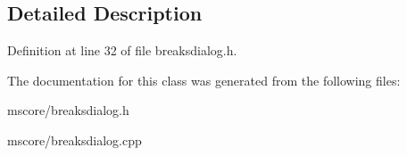 \subsection{Detailed Description}


Definition at line 32 of file breaksdialog.\+h.



The documentation for this class was generated from the following files\+:\begin{DoxyCompactItemize}
\item 
mscore/breaksdialog.\+h\item 
mscore/breaksdialog.\+cpp\end{DoxyCompactItemize}
